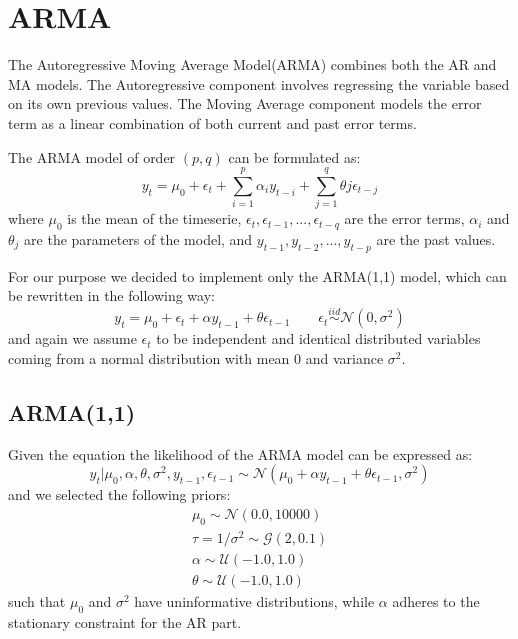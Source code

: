 \chapter{ARMA}
\label{ARMA}
The Autoregressive Moving Average Model(ARMA) combines both the AR and MA models. The Autoregressive component involves regressing the variable based on its own previous values. The Moving Average component models the error term as a linear combination of both current and past error terms.

The ARMA model of order $(p,q)$ can be formulated as:
\begin{equation}
    y_{t}=\mu_{0}+\epsilon_t +\sum^{p}_{i=1}\alpha_{i} y_{t-i} + \sum^{q}_{j=1}\theta{j} \epsilon_{t-j}
\end{equation}
where $\mu_{0}$ is the mean of the timeserie, $\epsilon_{t}, \epsilon_{t-1}, ..., \epsilon_{t-q}$ are the error terms, $\alpha_{i}$ and $\theta_{j}$ are the parameters of the model, and $y_{t-1}, y_{t-2}, ..., y_{t-p}$ are the past values.

For our purpose we decided to implement only the ARMA(1,1) model, which can be rewritten in the following way:
\begin{equation}
    \label{ARMA_q1}
    y_{t}=\mu_{0}+\epsilon_t +\alpha y_{t-1} + \theta \epsilon_{t-1} \qquad 
    \epsilon_t \stackrel{iid}{\sim} \mathcal{N}(0,\sigma^2)
\end{equation}
and again we assume $\epsilon_{t}$ to be independent and identical distributed variables coming from a normal distribution with mean $0$ and variance $\sigma^2$.

\section*{ARMA(1,1)}
Given the equation  the likelihood of the ARMA model can be expressed as:
\begin{equation}
    y_{t}|\mu_{0},\alpha,\theta,\sigma^2,y_{t-1},\epsilon_{t-1}\sim \mathcal{N}(\mu_{0} + \alpha y_{t-1} + \theta \epsilon_{t-1}, \sigma^2)
\end{equation}
and we selected the following priors:
\begin{equation}
    \begin{split}
        \mu_0 \sim \mathcal{N}(0.0, 10000) \\
        \tau = 1 / \sigma^2 \sim \mathcal{G}(2, 0.1) \\
        \alpha \sim \mathcal{U}(-1.0, 1.0) \\
        \theta \sim \mathcal{U}(-1.0, 1.0)
    \end{split}
\end{equation}
such that $\mu_{0}$ and $\sigma^2$ have uninformative distributions, while $\alpha$ adheres to the stationary constraint for the AR part.

